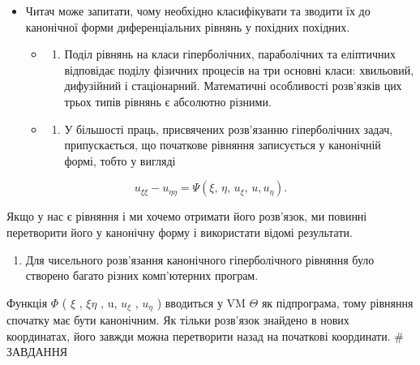 \documentclass[
  ukrainian,
]{article}
\providecommand{\tightlist}{%
  \setlength{\itemsep}{0pt}\setlength{\parskip}{0pt}}
\begin{document}
\begin{itemize}
\tightlist
\item
  Читач може запитати, чому необхідно класифікувати та зводити їх до
  канонічної форми диференціальних рівнянь у похідних похідних.

  \begin{itemize}
  \tightlist
  \item
    \begin{enumerate}
    \def\labelenumi{\alph{enumi})}
    \tightlist
    \item
      Поділ рівнянь на класи гіперболічних, параболічних та еліптичних
      відповідає поділу фізичних процесів на три основні класи:
      хвильовий, дифузійний і стаціонарний. Математичні особливості
      розв'язків цих трьох типів рівнянь є абсолютно різними.
    \end{enumerate}
  \item
    \begin{enumerate}
    \def\labelenumi{\alph{enumi})}
    \setcounter{enumi}{1}
    \tightlist
    \item
      У більшості праць, присвячених розв'язанню гіперболічних задач,
      припускається, що початкове рівняння записується у канонічній
      формі, тобто у вигляді
    \end{enumerate}
  \end{itemize}
\end{itemize}

\[
u_{\xi\xi} - u_{\eta\eta} = \Psi(\xi, \, \eta, \, u_{\xi}, \, u, u_{\eta}).
\]

Якщо у нас є рівняння і ми хочемо отримати його розв'язок, ми повинні
перетворити його у канонічну форму і використати відомі результати.

\begin{enumerate}
\def\labelenumi{\alph{enumi})}
\setcounter{enumi}{2}
\tightlist
\item
  Для чисельного розв'язання канонічного гіперболічного рівняння було
  створено багато різних комп'ютерних програм.
\end{enumerate}

Функція \(\Phi\) ( \(\xi\) , \(\xi \eta\) , u, \(u_{\xi}\) ,
\(u_{\eta}\) ) вводиться у VM \(\Theta\) як підпрограма, тому рівняння
спочатку має бути канонічним. Як тільки розв'язок знайдено в нових
координатах, його завжди можна перетворити назад на початкові
координати. \# ЗАВДАННЯ
\end{document}

